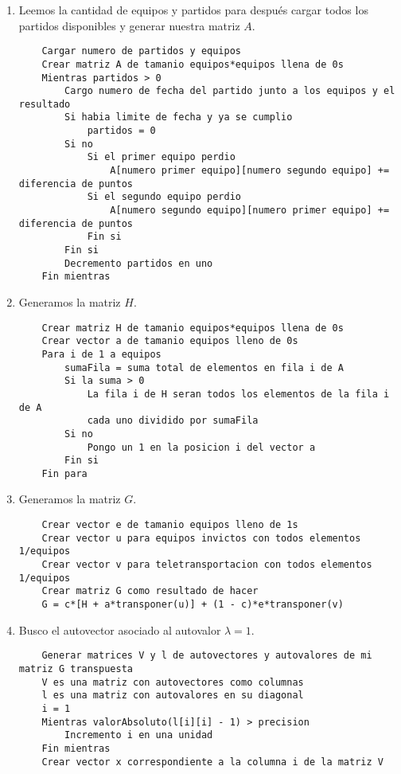 \begin{enumerate}
	\item Leemos la cantidad de equipos y partidos para después cargar todos los
	partidos disponibles y generar nuestra matriz $A$.
	\begin{lstlisting}
	Cargar numero de partidos y equipos
	Crear matriz A de tamanio equipos*equipos llena de 0s
	Mientras partidos > 0
		Cargo numero de fecha del partido junto a los equipos y el resultado
		Si habia limite de fecha y ya se cumplio
			partidos = 0
		Si no
			Si el primer equipo perdio
				A[numero primer equipo][numero segundo equipo] += diferencia de puntos
			Si el segundo equipo perdio
				A[numero segundo equipo][numero primer equipo] += diferencia de puntos
			Fin si
		Fin si
		Decremento partidos en uno
	Fin mientras
	\end{lstlisting}

	\item Generamos la matriz $H$.
	\begin{lstlisting}
	Crear matriz H de tamanio equipos*equipos llena de 0s
	Crear vector a de tamanio equipos lleno de 0s
	Para i de 1 a equipos
		sumaFila = suma total de elementos en fila i de A
		Si la suma > 0
			La fila i de H seran todos los elementos de la fila i de A
			cada uno dividido por sumaFila
		Si no
			Pongo un 1 en la posicion i del vector a
		Fin si
	Fin para
	\end{lstlisting}

	\item Generamos la matriz $G$.
	\begin{lstlisting}
	Crear vector e de tamanio equipos lleno de 1s
	Crear vector u para equipos invictos con todos elementos 1/equipos
	Crear vector v para teletransportacion con todos elementos 1/equipos
	Crear matriz G como resultado de hacer
	G = c*[H + a*transponer(u)] + (1 - c)*e*transponer(v)
	\end{lstlisting}

	\item Busco el autovector asociado al autovalor $\lambda = 1$.
	\begin{lstlisting}
	Generar matrices V y l de autovectores y autovalores de mi matriz G transpuesta
	V es una matriz con autovectores como columnas
	l es una matriz con autovalores en su diagonal
	i = 1
	Mientras valorAbsoluto(l[i][i] - 1) > precision
		Incremento i en una unidad
	Fin mientras
	Crear vector x correspondiente a la columna i de la matriz V
	\end{lstlisting}


\end{enumerate}
